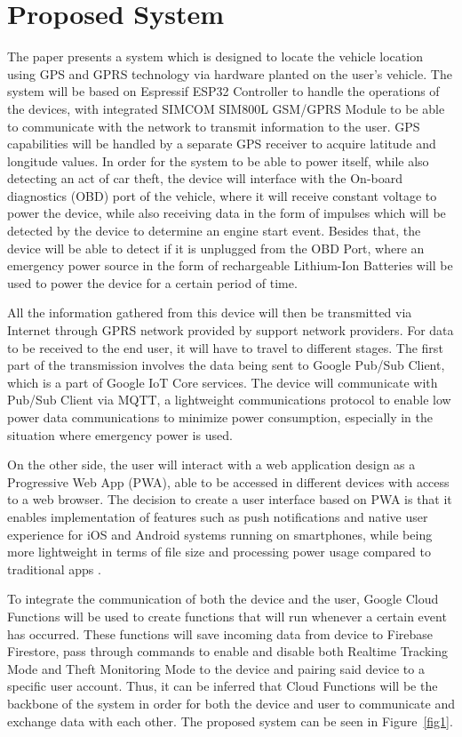\documentclass[conference]{IEEEtran}
\begin{document}
\section{Proposed System}
The paper presents a system which is designed to locate the vehicle location using GPS and GPRS technology via hardware planted on the user's vehicle. The system will be based on Espressif ESP32 Controller to handle the operations of the devices, with integrated SIMCOM SIM800L GSM/GPRS Module to be able to communicate with the network to transmit information to the user. GPS capabilities will be handled by a separate GPS receiver to acquire latitude and longitude values. In order for the system to be able to power itself, while also detecting an act of car theft, the device will interface with the On-board diagnostics (OBD) port of the vehicle, where it will receive constant voltage to power the device, while also receiving data in the form of impulses which will be detected by the device to determine an engine start event. Besides that, the device will be able to detect if it is unplugged from the OBD Port, where an emergency power source in the form of rechargeable Lithium-Ion Batteries will be used to power the device for a certain period of time. 

All the information gathered from this device will then be transmitted via Internet through GPRS network provided by support network providers. For data to be received to the end user, it will have to travel to different stages. The first 
part of the transmission involves the data being sent to Google Pub/Sub Client, which is a part of Google IoT Core services. The device will communicate with Pub/Sub Client via MQTT, a lightweight communications protocol to enable low power data communications to minimize power consumption, especially in the situation where emergency power is used. 

On the other side, the user will interact with a web application design as a Progressive Web App (PWA), able to be accessed in different devices with access to a web browser. 
The decision to create a user interface based on PWA is that it enables implementation of features such as push notifications and native user experience for iOS and Android systems running on smartphones, while being more lightweight in terms of file size and processing power usage compared to traditional apps \cite{8456349}.

To integrate the communication of both the device and the user, Google Cloud Functions will be used to create functions that will run whenever a certain event has occurred. These functions will save incoming data from device to Firebase Firestore, pass through commands to enable and disable both Realtime Tracking Mode and Theft Monitoring Mode to the device and pairing said device to a specific user account. Thus, it can be inferred that Cloud Functions will be the  backbone of the system in order for both the device and user to communicate and exchange data with each other. The proposed system can be seen in Figure~\ref{fig1}. 
\end{document}
